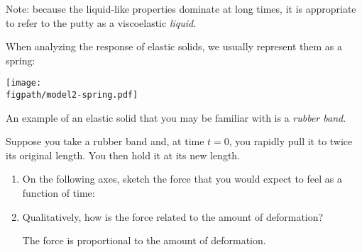 \begin{activity}
\begin{ctqs}
\begin{solution}[2in]
				Note: because the liquid-like properties dominate at long times, it is appropriate to refer to the putty as a viscoelastic \emph{liquid}.
				
			\end{solution}
		
\end{ctqs}

\begin{model}

	When analyzing the response of elastic solids, we usually represent them as a spring:
	
	\vspace{3pt}
	\centerline{\texttt{[image: \\figpath/model2-spring.pdf]}}
	
	An example of an elastic solid that you may be familiar with is a \emph{rubber band}.
	
\end{model}

\begin{ctqs}
	\question Suppose you take a rubber band and, at time $t=0$, you rapidly pull it to twice its original length. You then hold it at its new length. \label{\labelbase:ctq:rubberbandstepstrain}
	
		\begin{enumerate}
			\item On the following axes, sketch the force that you would expect to feel as a function of time:
			
				\begin{solution}[1.5in]
				\end{solution}
			
			\item Qualitatively, how is the force related to the amount of deformation?
			
				\begin{solution}[1.2in]
					The force is proportional to the amount of deformation.
				\end{solution}
			

\end{enumerate}
\end{ctqs}
\end{activity}
